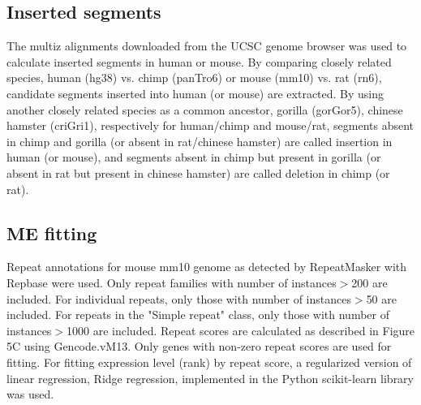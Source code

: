 
\subsection{Inserted segments}
The multiz alignments downloaded from the UCSC genome browser \citep{Kent_2002} was used to calculate inserted segments in human or mouse. By comparing closely related species, human (hg38) vs. chimp (panTro6) or mouse (mm10) vs. rat (rn6), candidate segments inserted into human (or mouse) are extracted. By using another closely related species as a common ancestor, gorilla (gorGor5), chinese hamster (criGri1), respectively for human/chimp and mouse/rat, segments absent in chimp and gorilla (or absent in rat/chinese hamster) are called insertion in human (or mouse), and segments absent in chimp but present in gorilla (or absent in rat but present in chinese hamster) are called deletion in chimp (or rat). 

\subsection{ME fitting}
Repeat annotations for mouse mm10 genome as detected by RepeatMasker \citep{repeatmasker} with Repbase \citep[ver. 20140131][]{Bao_2015} were used. Only repeat families with number of instances$>$200 are included. For individual repeats, only those with number of instances$>$50 are included. For repeats in the "Simple repeat" class, only those with number of instances$>$1000 are included. Repeat scores are calculated as described in Figure 5C using Gencode.vM13. Only genes with non-zero repeat scores are used for fitting. For fitting expression level (rank) by repeat score, a regularized version of linear regression, Ridge regression, implemented in the Python scikit-learn library \citep{scikit-learn} was used.

